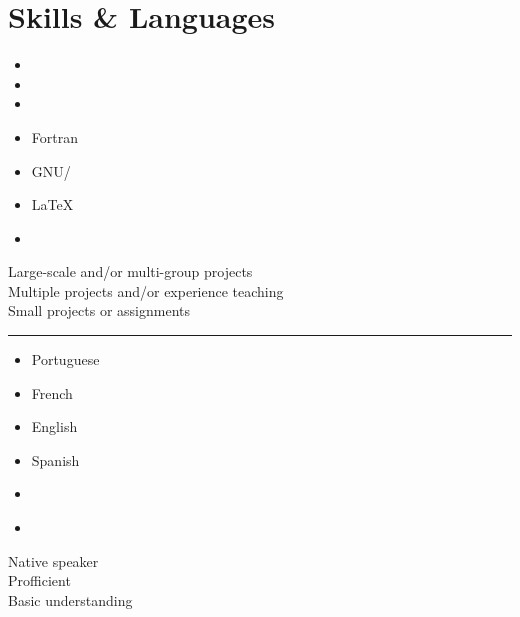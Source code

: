 \documentclass[10pt]{article}
\begin{document}
\begin{minipage}{\linewidth}
  \newcommand{\skills}[2]{
    \item #2 #1
  }
  \section{Skills \& Languages}
    \begin{multicols}{4}
      \raggedcolumns
      \begin{itemize}
        \renewcommand{\labelitemi}{}
        \renewcommand{\skill}{\textnormal}
        \setlength{\itemsep}{1pt}
        \setlength{\parskip}{0pt}
        \setlength{\parsep}{0pt}

        \skills{\python}{\threeskill}
        \skills{\ccpp}{\twoskill}
        \skills{\git}{\threeskill}
        \skills{Fortran}{\threeskill}
        \skills{GNU/\linux}{\threeskill}
        \skills{\LaTeX}{\twoskill}
        \skills{\matlab}{\oneskill}

      \end{itemize}
    \end{multicols}
    \begin{footnotesize}
      \raggedleft
        Large-scale and/or multi-group projects ~ \threeskill \\
        Multiple projects and/or experience teaching \twoskill \\
        Small projects or assignments \oneskill \\
    \end{footnotesize}

    \begin{center}
    \noindent\rule{8cm}{0.4pt}
    \end{center}

    \begin{multicols}{4}
      \begin{itemize}
      \renewcommand{\labelitemi}{}
      \setlength{\itemsep}{1pt}
      \setlength{\parskip}{0pt}
      \setlength{\parsep}{0pt}

      \skills{Portuguese}{\threeskill}
      \skills{French}{\oneskill}
      \skills{English}{\twoskill}
      \skills{Spanish}{\oneskill}
      \skills{~}{}
      \skills{~}{}
      \end{itemize}
    \end{multicols}
    \begin{minipage}{0.5\linewidth}
      \begin{footnotesize}
      \raggedleft
         Native speaker \threeskill \\
        Profficient \twoskill \\
        Basic understanding \oneskill \\
      \end{footnotesize}
    \end{minipage}

\end{minipage}
\end{document}
